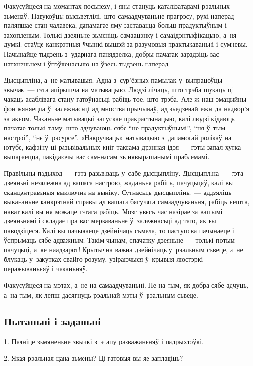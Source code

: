 Факусуйцеся на момантах посьпеху, і яны стануць каталізатарамі рэальных зьменаў. Навукоўцы высьветлілі, што самаадчуваньне прагрэсу, рухі наперад паляпшае стан чалавека, дапамагае яму заставацца больш прадуктыўным і захопленым. Толькі дзеяньне зьменіць самаацэнку і самаідэнтыфікацыю, а~ня думкі: стаўце канкрэтныя ўчынкі вышэй за разумовыя практыкаваньні і сумневы. Пачынайце тыдзень з~ударнага панядзелка, добры пачатак зарадзіць вас натхненьнем і ўпэўненасьцю на ўвесь тыдзень наперад.

Дысцыпліна, а~не матывацыя. Адна з~сур'ёзных памылак у~выпрацоўцы звычак~--- гэта апірышча на матывацыю. Людзі лічаць, што трэба шукаць ці чакаць асаблівага стану гатоўнасьці рабіць тое, што трэба. Але ж наш эмацыйны фон мяняецца ў~залежнасьці ад мноства прычынаў, ад зьедзенай ежы да надвор'я за акном. Чаканьне матывацыі запускае пракрастынацыю, калі людзі кідаюць пачатае толькі таму, што адчуваюць сябе ``не прадуктыўнымі'', ``ня ў~тым настроі'', ``не ў~рэсурсе''. «Накручваць» матывацыю з~дапамогай ролікаў на ютубе, кафэіну ці разьвівальных кніг таксама дрэнная ідэя~--- гэты запал хутка выпараецца, пакідаючы вас сам-насам зь нявырашанымі праблемамі.

Правільны падыход~--- гэта разьвіваць у~сабе дысцыпліну. Дысцыпліна~--- гэта дзеяньні незалежна ад вашага настрою, жаданьня рабіць, пачуцьцяў, калі вы сканцэнтраваныя выключна на выніку. Сутнасьць дысцыпліны~--- аддзяліць выкананьне канкрэтнай справы ад вашага бягучага самаадчуваньня, рабіць нешта, нават калі вы ня можаце гэтага рабіць. Мозг увесь час назірае за вашымі дзеяньнямі і складае пра вас меркаваньне ў~залежнасьці ад таго, як вы паводзіцеся. Калі вы пачынаеце дзейнічаць сьмела, то паступова пачынаеце і ўспрымаць сябе адважным. Такім чынам, спачатку дзеяньне~--- толькі потым пачуцьці, а~не наадварот! Крытычна важна дзейнічаць у~рэальным сьвеце, а~не блукаць у~закутках свайго розуму, узіраючыся ў~крывыя люстэркі перажываньняў і чаканьняў. 

Факусуйцеся на мэтах, а~не на самаадчуваньні. Не на тым, як добра сябе адчуць, а~на тым, як лепш дасягнуць рэальнай мэты ў~рэальным сьвеце.

\subsection*{Пытаньні і заданьні}

1. Пачніце зьмяненьне звычкі з~этапу разважаньняў і падрыхтоўкі.

2. Якая рэальная цана зьмены? Ці гатовыя вы яе заплаціць?

